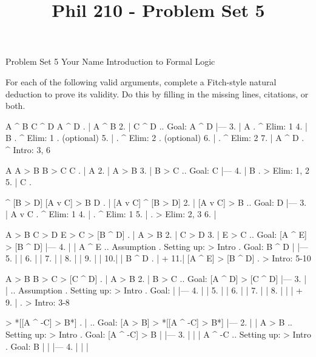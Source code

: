 
\title{Phil 210 - Problem Set 5}

\heading
Problem Set 5
Your Name
Introduction to Formal Logic
\endheading

For each of the following valid arguments, complete a Fitch-style natural deduction to prove its validity. Do this by filling in the missing lines, citations, or both.

\problems
{}
\argument
 A ^ B
 C ^ D
\argumentline
 A ^ D
\endargument
        \answer
        . | A ^ B
         2. | C ^ D  ..  Goal: A ^ D
            |---
         3. | A      .  ^ Elim: 1
         4. | B      .  ^ Elim: 1  .  (optional)
         5. |        .  ^ Elim: 2  .  (optional)
         6. |        .  ^ Elim: 2
         7. | A ^ D  .  ^ Intro: 3, 6
        \endfitchproof
        \endanswer

\argument
 A
 A > B
 B > C
\argumentline
 C
\endargument
        \answer
        . | A
         2. | A > B
         3. | B > C  ..  Goal: C
            |---
         4. | B      .  > Elim: 1, 2
         5. | C      .  
        \endfitchproof
        \endanswer

\argument
 [A v C] ^ [B > D]
 [A v C] > B
\argumentline
 D
\endargument
        \answer
        . | [A v C] ^ [B > D]
         2. | [A v C] > B        ..  Goal: D
            |---
         3. | A v C              .  ^ Elim: 1
         4. |                    .  ^ Elim: 1
         5. |                    .  > Elim: 2, 3
         6. | 
        \endfitchproof
        \endanswer

\argument
 A > B
 C > D
 E > C
\argumentline
 [A ^ E] > [B ^ D]
\endargument
        \answer
        . | A > B
         2. | C > D
         3. | E > C      ..  Goal: [A ^ E] > [B ^ D]
            |---
         4. |   | A ^ E  ..  Assumption  .  Setting up: > Intro  .  Goal: B ^ D
            |   |---
         5. |   | 
         6. |   | 
         7. |   | 
         8. |   | 
         9. |   | 
         10.|   | B ^ D   .  
            |   +
         11.| [A ^ E] > [B ^ D]  .  > Intro: 5-10
        \endfitchproof
        \endanswer

\argument
 A > B
 B > C
\argumentline
 [A ^ D] > [C ^ D]
\endargument
        \answer
        . | A > B
         2. | B > C      ..  Goal: [A ^ D] > [C ^ D]
            |---
         3. |   |        ..  Assumption  .  Setting up: > Intro  .  Goal: 
            |   |---
         4. |   | 
         5. |   | 
         6. |   | 
         7. |   | 
         8. |   | 
            |   +
         9. |            .  > Intro: 3-8
        \endfitchproof
        \endanswer

\argument
\argumentline
 [A > B] > *[[A ^ -C] > B*]
\endargument
        \answer
        . |                 ..  Goal: [A > B] > *[[A ^ -C] > B*]
            |---
         2. |   | A > B       ..  Setting up: > Intro  .  Goal: [A ^ -C] > B
            |   |---
         3. |   |   | A ^ -C  ..  Setting up: > Intro  .  Goal: B
            |   |   |---
         4. |   |   | 
        \endfitchproof
        \endanswer

\endproblems
\bye
